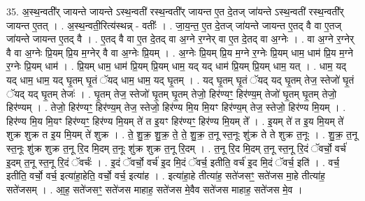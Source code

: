 \documentclass[17pt]{extarticle}
\begin{document}
35. अ॒स्थ॒न्वती᳚र् जायन्ते जायन्ते ऽस्थ॒न्वती॑ रस्थ॒न्वती᳚र् जायन्त ए॒त दे॒तज् जा॑यन्ते ऽस्थ॒न्वती॑ रस्थ॒न्वती᳚र् जायन्त ए॒तत् । . अ॒स्थ॒न्वती॒रित्य॑स्थन्न् - वतीः᳚ । . जा॒य॒न्त॒ ए॒त दे॒तज् जा॑यन्ते जायन्त ए॒तद् वै वा ए॒तज् जा॑यन्ते जायन्त ए॒तद् वै । . ए॒तद् वै वा ए॒त दे॒तद् वा अ॒ग्ने र॒ग्नेर् वा ए॒त दे॒तद् वा अ॒ग्नेः । . वा अ॒ग्ने र॒ग्नेर् वै वा अ॒ग्नेः प्रि॒यम् प्रि॒य म॒ग्नेर् वै वा अ॒ग्नेः प्रि॒यम् । . अ॒ग्नेः प्रि॒यम् प्रि॒य म॒ग्ने र॒ग्नेः प्रि॒यम् धाम॒ धाम॑ प्रि॒य म॒ग्ने र॒ग्नेः प्रि॒यम् धाम॑ । . प्रि॒यम् धाम॒ धाम॑ प्रि॒यम् प्रि॒यम् धाम॒ यद् यद् धाम॑ प्रि॒यम् प्रि॒यम् धाम॒ यत् । . धाम॒ यद् यद् धाम॒ धाम॒ यद् घृ॒तम् घृ॒तं ॅयद् धाम॒ धाम॒ यद् घृ॒तम् । . यद् घृ॒तम् घृ॒तं ॅयद् यद् घृ॒तम् तेज॒ स्तेजो॑ घृ॒तं ॅयद् यद् घृ॒तम् तेजः॑ । . घृ॒तम् तेज॒ स्तेजो॑ घृ॒तम् घृ॒तम् तेजो॒ हिर॑ण्यꣳ॒॒ हिर॑ण्य॒म् तेजो॑ घृ॒तम् घृ॒तम् तेजो॒ हिर॑ण्यम् । . तेजो॒ हिर॑ण्यꣳ॒॒ हिर॑ण्य॒म् तेज॒ स्तेजो॒ हिर॑ण्य मि॒य मि॒यꣳ हिर॑ण्य॒म् तेज॒ स्तेजो॒ हिर॑ण्य मि॒यम् । . हिर॑ण्य मि॒य मि॒यꣳ हिर॑ण्यꣳ॒॒ हिर॑ण्य मि॒यम् ते॑ त इ॒यꣳ हिर॑ण्यꣳ॒॒ हिर॑ण्य मि॒यम् ते᳚ । . इ॒यम् ते॑ त इ॒य मि॒यम् ते॑ शुक्र शुक्र त इ॒य मि॒यम् ते॑ शुक्र । . ते॒ शु॒क्र॒ शु॒क्र॒ ते॒ ते॒ शु॒क्र॒ त॒नू स्त॒नूः शु॑क्र ते ते शुक्र त॒नूः । . शु॒क्र॒ त॒नू स्त॒नूः शु॑क्र शुक्र त॒नू रि॒द मि॒दम् त॒नूः शु॑क्र शुक्र त॒नू रि॒दम् । . त॒नू रि॒द मि॒दम् त॒नू स्त॒नू रि॒दं ॅवर्चो॒ वर्च॑ इ॒दम् त॒नू स्त॒नू रि॒दं ॅवर्चः॑ । . इ॒दं ॅवर्चो॒ वर्च॑ इ॒द मि॒दं ॅवर्च॒ इतीति॒ वर्च॑ इ॒द मि॒दं ॅवर्च॒ इति॑ । . वर्च॒ इतीति॒ वर्चो॒ वर्च॒ इत्या॑हा॒हेति॒ वर्चो॒ वर्च॒ इत्या॑ह । . इत्या॑हा॒हे तीत्या॑ह॒ सते॑जसꣳ॒॒ सते॑जस मा॒हे तीत्या॑ह॒ सते॑जसम् । . आ॒ह॒ सते॑जसꣳ॒॒ सते॑जस माहाह॒ सते॑जस मे॒वैव सते॑जस माहाह॒ सते॑जस मे॒व । \newline
\end{document}
